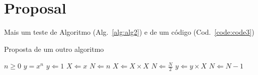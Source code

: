 \chapter[Proposal]{Proposal}

Mais um teste de Algoritmo (Alg.~\ref{alg:alg2}) e de um código (Cod.~\ref{code:code3})



\begin{algorithm}
\caption{Proposta de um outro algoritmo}\label{alg:alg2}
\begin{algorithmic}
\Require $n \geq 0$
\Ensure $y = x^n$
\State $y \Leftarrow 1$
\State $X \Leftarrow x$
\State $N \Leftarrow n$
  \State $X \Leftarrow X \times X$
  \State $N \Leftarrow \frac{N}{2} $  
  \State $y \Leftarrow y \times X$
  \State $N \Leftarrow N - 1$
\EndIf
\EndWhile
\end{algorithmic}
\end{algorithm}

